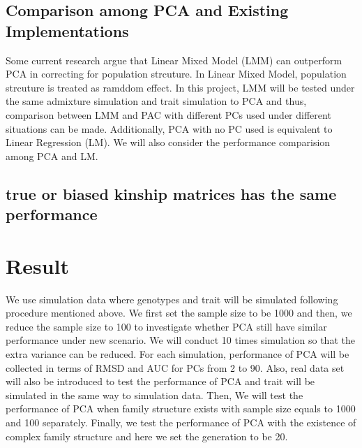 \documentclass[12pt]{article}
\begin{document}
\subsection{Comparison among PCA and Existing Implementations }
Some current research argue that Linear Mixed Model (LMM) can outperform PCA in correcting for population strcuture. In Linear Mixed Model, population strcuture is treated as ramddom effect. In this project, LMM will be tested under the same admixture simulation and trait simulation to PCA and thus, comparison between LMM and PAC with different PCs used under different situations can be made. Additionally, PCA with no PC used is equivalent to Linear Regression (LM). We will also consider the performance comparision among PCA and LM. 

\subsection{true or biased kinship matrices has the same performance}



\section{Result}

We use simulation data where genotypes and trait will be simulated following procedure mentioned above. We first set the sample size to be 1000 and then, we reduce the sample size to 100 to investigate whether PCA still have similar performance under new scenario. We will conduct 10 times simulation so that the extra variance can be reduced. For each simulation, performance of PCA will be collected in terms of RMSD and AUC for PCs from 2 to 90. Also, real data set will also be introduced to test the performance of PCA and trait will be simulated in the same way to simulation data. Then, We will test the performance of PCA when family structure exists with sample size equals to 1000 and 100 separately. Finally, we test the performance of PCA with the existence of complex family structure and here we set the generation to be 20.
\end{document}
